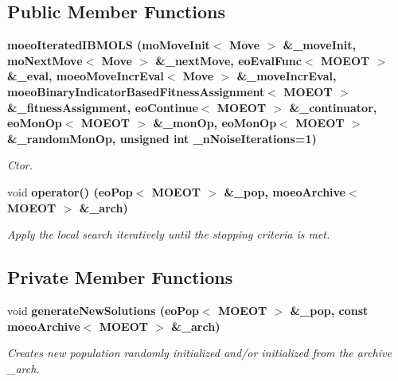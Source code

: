 \subsection*{Public Member Functions}
\begin{CompactItemize}
\item 
\bf{moeo\-Iterated\-IBMOLS} (mo\-Move\-Init$<$ Move $>$ \&\_\-move\-Init, mo\-Next\-Move$<$ Move $>$ \&\_\-next\-Move, eo\-Eval\-Func$<$ MOEOT $>$ \&\_\-eval, \bf{moeo\-Move\-Incr\-Eval}$<$ Move $>$ \&\_\-move\-Incr\-Eval, \bf{moeo\-Binary\-Indicator\-Based\-Fitness\-Assignment}$<$ MOEOT $>$ \&\_\-fitness\-Assignment, eo\-Continue$<$ MOEOT $>$ \&\_\-continuator, eo\-Mon\-Op$<$ MOEOT $>$ \&\_\-mon\-Op, eo\-Mon\-Op$<$ MOEOT $>$ \&\_\-random\-Mon\-Op, unsigned int \_\-n\-Noise\-Iterations=1)
\begin{CompactList}\small\item\em Ctor. \item\end{CompactList}\item 
void \bf{operator()} (eo\-Pop$<$ MOEOT $>$ \&\_\-pop, \bf{moeo\-Archive}$<$ MOEOT $>$ \&\_\-arch)
\begin{CompactList}\small\item\em Apply the local search iteratively until the stopping criteria is met. \item\end{CompactList}\end{CompactItemize}
\subsection*{Private Member Functions}
\begin{CompactItemize}
\item 
void \bf{generate\-New\-Solutions} (eo\-Pop$<$ MOEOT $>$ \&\_\-pop, const \bf{moeo\-Archive}$<$ MOEOT $>$ \&\_\-arch)
\begin{CompactList}\small\item\em Creates new population randomly initialized and/or initialized from the archive \_\-arch. \item\end{CompactList}\end{CompactItemize}
